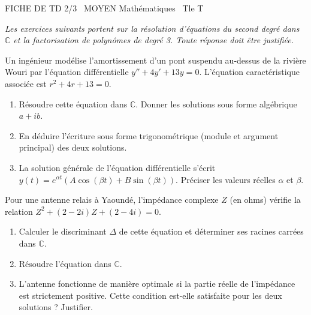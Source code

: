\documentclass[11pt]{article}
\begin{document}
\begin{tcolorbox}[enhanced,colback=popink,colframe=popink,arc=10pt,boxrule=0pt,left=12pt,right=12pt,top=9pt,bottom=9pt]
{\color{white}\popxbold\small FICHE DE TD 2/3 \textbullet\ MOYEN \hfill Mathématiques \textbullet\ Tle T\par}
\end{tcolorbox}
\vspace{4pt}
\emph{Les exercices suivants portent sur la résolution d'équations du second degré dans $\mathbb{C}$ et la factorisation de polynômes de degré 3. Toute réponse doit être justifiée.}

\begin{exercice}
Un ingénieur modélise l'amortissement d'un pont suspendu au-dessus de la rivière Wouri par l'équation différentielle $y'' + 4y' + 13y = 0$. L'équation caractéristique associée est $r^2 + 4r + 13 = 0$.
\begin{enumerate}
    \item Résoudre cette équation dans $\mathbb{C}$. Donner les solutions sous forme algébrique $a + ib$.
    \item En déduire l'écriture sous forme trigonométrique (module et argument principal) des deux solutions.
    \item La solution générale de l'équation différentielle s'écrit $y(t) = e^{\alpha t}(A\cos(\beta t) + B\sin(\beta t))$. Préciser les valeurs réelles $\alpha$ et $\beta$.
\end{enumerate}
\end{exercice}

\begin{exercice}
Pour une antenne relais à Yaoundé, l'impédance complexe $Z$ (en ohms) vérifie la relation $Z^2 + (2 - 2i)Z + (2 - 4i) = 0$.
\begin{enumerate}
    \item Calculer le discriminant $\Delta$ de cette équation et déterminer ses racines carrées dans $\mathbb{C}$.
    \item Résoudre l'équation dans $\mathbb{C}$.
    \item L'antenne fonctionne de manière optimale si la partie réelle de l'impédance est strictement positive. Cette condition est-elle satisfaite pour les deux solutions ? Justifier.
\end{enumerate}
\end{exercice}
\end{document}
